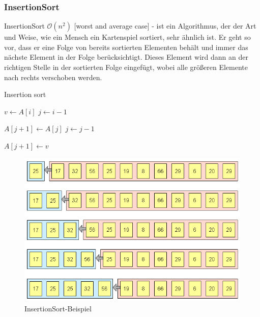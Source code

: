 \documentclass[a4paper]{article}
\begin{document}
 \subsubsection{InsertionSort}\label{Insertionsort}
    InsertionSort $\mathcal{O}(n^2)$ [worst and average case] - ist ein Algorithmus, der der Art und Weise, wie ein Mensch ein Kartenspiel sortiert, sehr ähnlich ist. Er geht so vor, dass er eine Folge von bereits sortierten Elementen behält und immer das nächste Element in der Folge berücksichtigt. Dieses Element wird dann an der richtigen Stelle in der sortierten Folge eingefügt, wobei alle größeren Elemente nach rechts verschoben werden.

\begin{algorithm}
    \caption{Insertion sort}
    \label{alg:InsertionSort}
    \begin{algorithmic} 
        \State $v \gets A\left[i\right]$
        \State $j \gets i-1$
        
        \State $A\left[j+1\right] \gets A\left[j\right]$
        \State $j\leftarrow j-1$
        \EndWhile
        
        \State $A\left[j+1\right] \gets v$
        \EndFor
    \end{algorithmic}
\end{algorithm}

    \begin{figure}[h]
        \centering
        \includegraphics[scale=0.3]{Pictures/insertionsort_version1.png}
        \caption{InsertionSort-Beispiel}
        \label{fig:InsertionSort}
    \end{figure}
    
\end{document}
